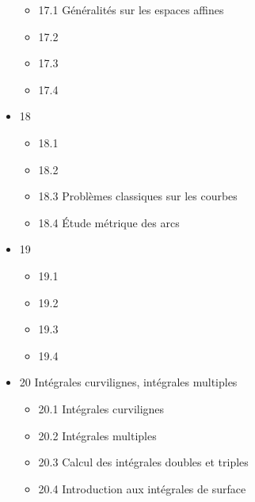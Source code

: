 \documentclass{article}
\begin{document}
\begin{itemize}
\begin{itemize}
      \item 17.1 Généralités sur les espaces affines
      \item 17.2
      \item 17.3
      \item 17.4
    \end{itemize}
  \item 18
    \begin{itemize}
      \item 18.1
      \item 18.2
      \item 18.3 Problèmes classiques sur les courbes
      \item 18.4 Étude métrique des arcs
    \end{itemize}
  \item 19
    \begin{itemize}
      \item 19.1
      \item 19.2
      \item 19.3
      \item 19.4
    \end{itemize}
  \item 20 Intégrales curvilignes, intégrales multiples
    \begin{itemize}
      \item 20.1 Intégrales curvilignes
      \item 20.2 Intégrales multiples
      \item 20.3 Calcul des intégrales doubles et triples
      \item 20.4 Introduction aux intégrales de surface
    \end{itemize}
\end{itemize}
\end{document}
